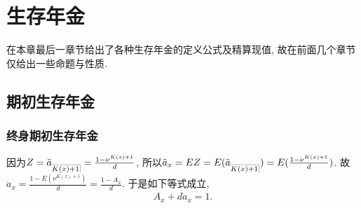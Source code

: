 \documentclass[lang=cn,10pt]{elegantbook}
\makeatletter
\DeclareRobustCommand{\annu}[1]{_{%
    \def\arraystretch{0}%
    \setlength\arraycolsep{1pt}%
    \setlength\arrayrulewidth{.2pt}%
    \begin{array}[b]{@{}c|}\hline
        \\[\arraycolsep]%
        \scriptstyle #1%
    \end{array}%
}}
\makeatother
\begin{document}



\chapter{生存年金}
在本章最后一章节给出了各种生存年金的定义公式及精算现值, 故在前面几个章节仅给出一些命题与性质. 
\section{期初生存年金}
\subsection{终身期初生存年金}
\begin{corollary}
	因为$Z=\ddot a_{\annu {K(x)+1}}=\frac{1-\nu^{K(x)+1}}{d}$, 所以$\ddot a_x=EZ=E(\ddot a_{\annu {K(x)+1}})=E(\frac{1-\nu^{K(x)+1}}{d})$. 故$\ddot a_{x}=\frac{1-E(\nu^{K(x)+1})}{d}=\frac{1-A_x}{d}$.
于是如下等式成立,
\begin{align*}
    A_x+d \ddot a_x=1.
\end{align*}
\end{corollary}
\end{document}
